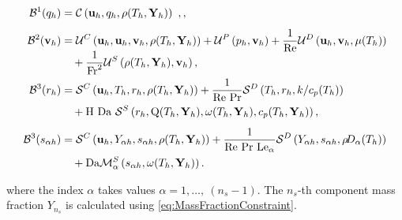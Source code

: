 \begin{subequations}
	\begin{align}%
		\mathcal{B}^1(q_h) 
		&= \ContDis\ ,,  \label{DiscretizedConti}  		\\[1ex]
		\mathcal{B}^2(\vec{v}_h) 
		&=	\MomConv + \MomPres + \frac{1}{\Reynolds}\MomDiff  \notag \\
		&\quad + \smash{\frac{1}{\Froude^2}}\MomSource, \label{DiscretizedMomentum} 	\\[1ex]
		\mathcal{B}^3(r_h) 
		&= \mathcal{S}^C\left(\vec{u}_h,T_h,r_h, \rhoh\right) + \frac{1}{\Reynolds~\Prandtl}\mathcal{S}^D\left(T_h,r_h,k/c_p(T_h)\right)  \notag \\
		&\quad + \text{H}~\Da ~ \mathcal{S}^S\left(r_h, \heatRelease(T_h,\vec{Y}_h), \rateReac(T_h,\vec{Y}_h),\cph\right), \label{DiscretizedEnergy} 	\\[1ex]
		\mathcal{B}^3(s_{\alpha h}) 
		&= \mathcal{S}^C\left(\vec{u}_h,\Yi, s_{\alpha h}, \rhoh\right) + \frac{1}{\Reynolds~\Prandtl~\Lewis_\alpha}\mathcal{S}^D\left(\Yi,s_{\alpha h},\rhodh\right)  \notag \\
		&\quad + \Da \mathcal{M}^S_\alpha\left(s_{\alpha h},\rateReac(T_h,\vec{Y}_h )\right). \label{DiscretizedMassFractions} 
	\end{align}\label{eqs:variatProblemFull}
\end{subequations} 

where the index $\alpha$ takes values $\alpha = 1, \dots,~(n_s - 1)$. The $n_s$-th component mass fraction $Y_{n_s}$ is calculated using \cref{eq:MassFractionConstraint}.
